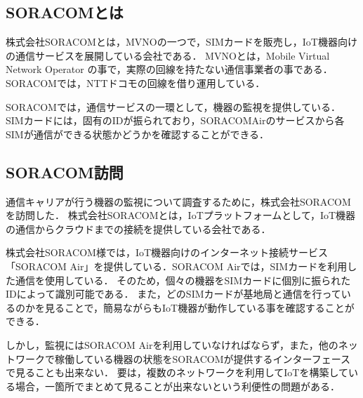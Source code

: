

\subsection{SORACOMとは}
株式会社SORACOMとは，MVNOの一つで，SIMカードを販売し，IoT機器向けの通信サービスを展開している会社である．
MVNOとは，Mobile Virtual Network Operator の事で，実際の回線を持たない通信事業者の事である．
SORACOMでは，NTTドコモの回線を借り運用している．

SORACOMでは，通信サービスの一環として，機器の監視を提供している．
SIMカードには，固有のIDが振られており，SORACOMAirのサービスから各SIMが通信ができる状態かどうかを確認することができる．

\subsection{SORACOM訪問}


通信キャリアが行う機器の監視について調査するために，株式会社SORACOMを訪問した．
株式会社SORACOMとは，IoTプラットフォームとして，IoT機器の通信からクラウドまでの接続を提供している会社である．

株式会社SORACOM様では，IoT機器向けのインターネット接続サービス「SORACOM Air」を提供している．SORACOM Airでは，SIMカードを利用した通信を使用している．
そのため，個々の機器をSIMカードに個別に振られたIDによって識別可能である．
また，どのSIMカードが基地局と通信を行っているのかを見ることで，簡易ながらもIoT機器が動作している事を確認することができる．

しかし，監視にはSORACOM Airを利用していなければならず，また，他のネットワークで稼働している機器の状態をSORACOMが提供するインターフェースで見ることも出来ない．
要は，複数のネットワークを利用してIoTを構築している場合，一箇所でまとめて見ることが出来ないという利便性の問題がある．


